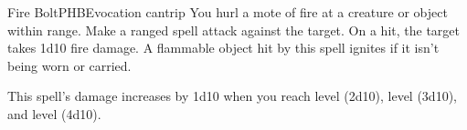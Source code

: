 \begin{spell}{Fire Bolt}{PHB}{Evocation cantrip}
{
}
You hurl a mote of fire at a creature or object within
range. Make a ranged spell attack against the
target. On a hit, the target takes 1d10 fire damage. A
flammable object hit by this spell ignites if it isn't being
worn or carried.

This spell's damage increases by 1d10 when you reach
 level (2d10),  level (3d10), and  level (4d10).
\end{spell}